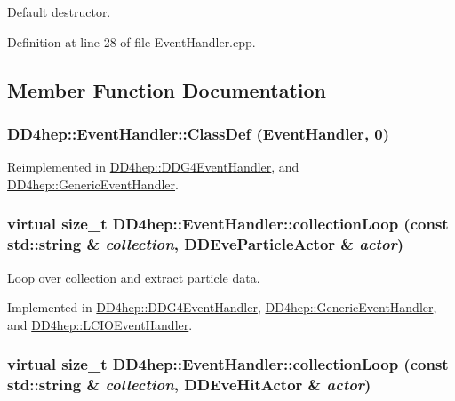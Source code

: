 Default destructor. 

Definition at line 28 of file EventHandler.cpp.

\subsection{Member Function Documentation}
\hypertarget{class_d_d4hep_1_1_event_handler_a44c310a4296693f09e62adbac3fbe2c6}{
\subsubsection[{ClassDef}]{\setlength{\rightskip}{0pt plus 5cm}DD4hep::EventHandler::ClassDef ({\bf EventHandler}, \/  0)}}
\label{class_d_d4hep_1_1_event_handler_a44c310a4296693f09e62adbac3fbe2c6}


Reimplemented in \hyperlink{class_d_d4hep_1_1_d_d_g4_event_handler_a0b89e00baf1f1e9a95f4f31517635e34}{DD4hep::DDG4EventHandler}, and \hyperlink{class_d_d4hep_1_1_generic_event_handler_abbb82b5fc62720e45ed6c2ff03ae526d}{DD4hep::GenericEventHandler}.\hypertarget{class_d_d4hep_1_1_event_handler_ae43595c2760736a7ca628183a2c91ec2}{
\subsubsection[{collectionLoop}]{\setlength{\rightskip}{0pt plus 5cm}virtual size\_\-t DD4hep::EventHandler::collectionLoop (const std::string \& {\em collection}, \/  {\bf DDEveParticleActor} \& {\em actor})}}
\label{class_d_d4hep_1_1_event_handler_ae43595c2760736a7ca628183a2c91ec2}


Loop over collection and extract particle data. 

Implemented in \hyperlink{class_d_d4hep_1_1_d_d_g4_event_handler_a9f45863ae9406f8d5ec1d309321c50d6}{DD4hep::DDG4EventHandler}, \hyperlink{class_d_d4hep_1_1_generic_event_handler_a401b32a86d996b71baa133c4f4b00709}{DD4hep::GenericEventHandler}, and \hyperlink{class_d_d4hep_1_1_l_c_i_o_event_handler_aa741ce2b60b3eddd4ddeb1fba6197a86}{DD4hep::LCIOEventHandler}.\hypertarget{class_d_d4hep_1_1_event_handler_a454baeb81b675f3ebd8bb4293064b787}{
\subsubsection[{collectionLoop}]{\setlength{\rightskip}{0pt plus 5cm}virtual size\_\-t DD4hep::EventHandler::collectionLoop (const std::string \& {\em collection}, \/  {\bf DDEveHitActor} \& {\em actor})}}
\label{class_d_d4hep_1_1_event_handler_a454baeb81b675f3ebd8bb4293064b787}


